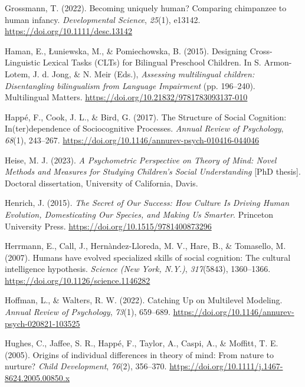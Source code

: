 \documentclass[
]{scrbook}
\newlength{\cslhangindent}
\newenvironment{CSLReferences}[2] %
 {\begin{list}{}{%
  \setlength{\itemindent}{0pt}
  \setlength{\leftmargin}{0pt}
  \setlength{\parsep}{0pt}
  \ifodd #1
   \setlength{\leftmargin}{\cslhangindent}
   \setlength{\itemindent}{-1\cslhangindent}
  \fi
  \setlength{\itemsep}{#2\baselineskip}}}
 {\end{list}}
\begin{document}
\begin{CSLReferences}{1}{0}
Grossmann, T. (2022). Becoming uniquely human? {Comparing} chimpanzee to human infancy. \emph{Developmental Science}, \emph{25}(1), e13142. \url{https://doi.org/10.1111/desc.13142}

Haman, E., Łuniewska, M., \& Pomiechowska, B. (2015). Designing {Cross-Linguistic Lexical Tasks} ({CLTs}) for {Bilingual Preschool Children}. In S. Armon-Lotem, J. d. Jong, \& N. Meir (Eds.), \emph{Assessing multilingual children: {Disentangling} bilingualism from {Language Impairment}} (pp. 196--240). Multilingual Matters. \url{https://doi.org/10.21832/9781783093137-010}

Happé, F., Cook, J. L., \& Bird, G. (2017). The {Structure} of {Social Cognition}: {In}(ter)dependence of {Sociocognitive Processes}. \emph{Annual Review of Psychology}, \emph{68}(1), 243--267. \url{https://doi.org/10.1146/annurev-psych-010416-044046}

Heise, M. J. (2023). \emph{A {Psychometric Perspective} on {Theory} of {Mind}: {Novel Methods} and {Measures} for {Studying Children}'s {Social Understanding}} {[}PhD thesis{]}. Doctoral dissertation, University of California, Davis.

Henrich, J. (2015). \emph{The {Secret} of {Our Success}: {How Culture Is Driving Human Evolution}, {Domesticating Our Species}, and {Making Us Smarter}}. Princeton University Press. \url{https://doi.org/10.1515/9781400873296}

Herrmann, E., Call, J., Hernàndez-Lloreda, M. V., Hare, B., \& Tomasello, M. (2007). Humans have evolved specialized skills of social cognition: The cultural intelligence hypothesis. \emph{Science (New York, N.Y.)}, \emph{317}(5843), 1360--1366. \url{https://doi.org/10.1126/science.1146282}

Hoffman, L., \& Walters, R. W. (2022). Catching {Up} on {Multilevel Modeling}. \emph{Annual Review of Psychology}, \emph{73}(1), 659--689. \url{https://doi.org/10.1146/annurev-psych-020821-103525}

Hughes, C., Jaffee, S. R., Happé, F., Taylor, A., Caspi, A., \& Moffitt, T. E. (2005). Origins of individual differences in theory of mind: From nature to nurture? \emph{Child Development}, \emph{76}(2), 356--370. \url{https://doi.org/10.1111/j.1467-8624.2005.00850.x}


\end{CSLReferences}
\end{document}
